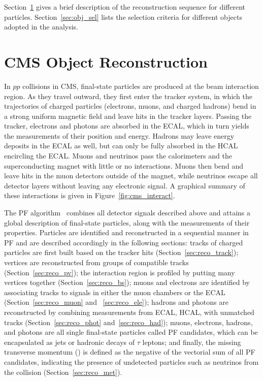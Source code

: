 Section~\ref{sec:obj_reco} gives a brief description of the reconstruction sequence for different particles.
Section~\ref{sec:obj_sel} lists the selection criteria for different objects adopted in the \hmm analysis.


\section{CMS Object Reconstruction}\label{sec:obj_reco}

In $pp$ collisions in CMS, final-state particles are produced at the beam interaction region. 
As they travel outward, they first enter the tracker system, in which the trajectories of charged particles 
(electrons, muons, and charged hadrons) bend in a strong uniform magnetic field and leave hits in the tracker layers. 
Passing the tracker, electrons and photons are absorbed in the ECAL, which in turn yields the measurements of their position and energy.
Hadrons may leave energy deposits in the ECAL as well, but can only be fully absorbed in the HCAL encircling the ECAL. 
Muons and neutrinos pass the calorimeters and the superconducting magnet with little or no interactions.
Muons then bend and leave hits in the muon detectors outside of the magnet, 
while neutrinos escape all detector layers without leaving any electronic signal.
A graphical summary of these interactions is given in Figure~\ref{fig:cms_interact}.

The PF algorithm~\cite{Sirunyan_2017} combines all detector signals described above and attains a global description of final-state particles, 
along with the measurements of their properties.
Particles are identified and reconstructed in a sequential manner in PF and are described accordingly in the following sections:
tracks of charged particles are first built based on the tracker hits (Section~\ref{sec:reco_track}); 
vertices are reconstructed from groups of compatible tracks (Section~\ref{sec:reco_pv});
the interaction region is profiled by putting many vertices together (Section~\ref{sec:reco_bs});
muons and electrons are identified by associating tracks to signals in either the muon chambers or the ECAL (Section~\ref{sec:reco_muon} and ~\ref{sec:reco_ele});
hadrons and photons are reconstructed by combining measurements from ECAL, HCAL, with unmatched tracks (Section~\ref{sec:reco_phot} and~\ref{sec:reco_had});
muons, electrons, hadrons, and photons are all single final-state particles called PF candidates, 
which can be encapsulated as jets or hadronic decays of $\tau$ leptons;
and finally, the missing transverse momentum (\MET) is defined as the negative of the vectorial sum of all PF candidates,
indicating the presence of undetected particles such as neutrinos from the collision (Section~\ref{sec:reco_met}).

